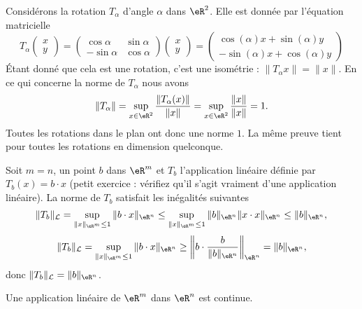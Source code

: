 \begin{example}
	Considérons la rotation $T_{\alpha}$ d'angle $\alpha$ dans $\eR^2$. Elle est donnée par l'équation matricielle
	\begin{equation}
		T_{\alpha}\begin{pmatrix}
			x	\\ 
			y	
		\end{pmatrix}=\begin{pmatrix}
			\cos\alpha	&	\sin\alpha	\\ 
			-\sin\alpha	&	\cos\alpha	
		\end{pmatrix}\begin{pmatrix}
			x	\\ 
			y	
		\end{pmatrix}=\begin{pmatrix}
			\cos(\alpha)x+\sin(\alpha)y	\\ 
			-\sin(\alpha)x+\cos(\alpha)y	
		\end{pmatrix}
	\end{equation}
	Étant donné que cela est une rotation, c'est une isométrie : $\| T_{\alpha}x \|=\| x \|$. En ce qui concerne la norme de $T_{\alpha}$ nous avons
	\begin{equation}
		\| T_{\alpha} \|=\sup_{x\in\eR^2}\frac{ \| T_{\alpha}(x) \| }{ \| x \| }=\sup_{x\in\eR^2}\frac{ \| x \| }{ \| x \| }=1.
	\end{equation}
	Toutes les rotations dans le plan ont donc une norme $1$. La même preuve tient pour toutes les rotations en dimension quelconque. 
\end{example}


\begin{example}
  Soit $m=n$, un point $b$ dans $\eR^m$ et $T_b$ l'application linéaire définie par $T_b(x)=b\cdot x$ (petit exercice : vérifiez qu'il s'agit vraiment d'une application linéaire).  La norme de $T_b$ satisfait les inégalités suivantes 
 \[
\|T_b\|_{\mathcal{L}}=\sup_{\|x\|_{\eR^m}\leq 1}\|b\cdot x\|_{\eR^n}\leq \sup_{\|x\|_{\eR^m}\leq 1}\|b \|_{\eR^n}\|x\cdot x\|_{\eR^n}\leq\|b \|_{\eR^n},
\]
\[
\|T_b\|_{\mathcal{L}}=\sup_{\|x\|_{\eR^m}\leq 1}\|b\cdot x\|_{\eR^n}\geq \left\|b\cdot \frac{b}{\|b \|_{\eR^n}}\right\|_{\eR^n}=\|b \|_{\eR^n},
\]
donc $\|T_b\|_{\mathcal{L}}=\|b \|_{\eR^n}$.
\end{example}

\begin{proposition}
    Une application linéaire de \( \eR^m\) dans \( \eR^n\) est continue.
\end{proposition}

